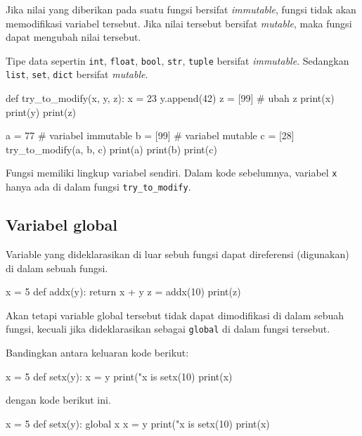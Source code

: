 
Jika nilai yang diberikan pada suatu fungsi bersifat \textit{immutable}, fungsi
tidak akan memodifikasi variabel tersebut. Jika nilai tersebut bersifat
\textit{mutable}, maka fungsi dapat mengubah nilai tersebut.

Tipe data sepertin \texttt{int}, \texttt{float},
\texttt{bool}, \texttt{str}, \texttt{tuple} bersifat \textit{immutable}.
Sedangkan \texttt{list}, \texttt{set}, \texttt{dict}
bersifat \textit{mutable}. 

\begin{pythoncode}
def try_to_modify(x, y, z):
    x = 23
    y.append(42)
    z = [99] # ubah z
    print(x)
    print(y)
    print(z)

a = 77    # variabel immutable
b = [99]  # variabel mutable
c = [28]
try_to_modify(a, b, c)
print(a)
print(b)
print(c)
\end{pythoncode}

Fungsi memiliki lingkup variabel sendiri. Dalam kode sebelumnya,
variabel \texttt{x} hanya ada di dalam fungsi \texttt{try\_to\_modify}.


\subsection{Variabel global}

Variable yang dideklarasikan di luar sebuh fungsi dapat direferensi (digunakan)
di dalam sebuah fungsi.

\begin{pythoncode}
x = 5
def addx(y):
    return x + y
z = addx(10)
print(z)
\end{pythoncode}

Akan tetapi variable global tersebut tidak dapat dimodifikasi di dalam sebuah
fungsi, kecuali jika dideklarasikan sebagai \texttt{global} di dalam fungsi
tersebut.

Bandingkan antara keluaran kode berikut:
\begin{pythoncode}
x = 5
def setx(y):
    x = y
    print("x is %
setx(10)
print(x)
\end{pythoncode}
%
dengan kode berikut ini.
%
\begin{pythoncode}
x = 5
def setx(y):
    global x
    x = y
    print("x is %
setx(10)
print(x)
\end{pythoncode}


